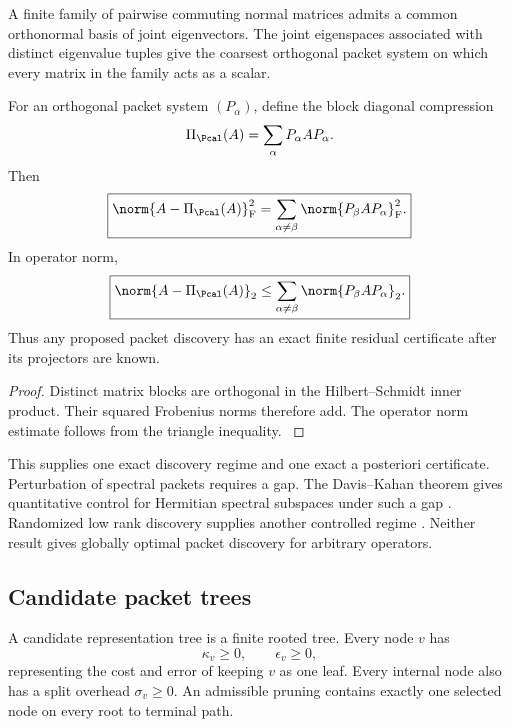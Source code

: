 \begin{standardfact}\label{main:standardfact:004}\label{fact:simultaneous}
A finite family of pairwise commuting normal matrices admits a common orthonormal basis of joint eigenvectors. The joint eigenspaces associated with distinct eigenvalue tuples give the coarsest orthogonal packet system on which every matrix in the family acts as a scalar.
\end{standardfact}

\begin{proposition}\label{main:proposition:008}\label{prop:block_discovery_certificate}
For an orthogonal packet system \((P_\alpha)\), define the block diagonal compression
\[
\Pi_{\Pcal}(A)
=
\sum_\alpha P_\alpha AP_\alpha.
\]
Then
\[
\boxed{
\norm{A-\Pi_{\Pcal}(A)}_{\rm F}^2
=
\sum_{\alpha\neq\beta}
\norm{P_\beta AP_\alpha}_{\rm F}^2.
}
\]
In operator norm,
\[
\boxed{
\norm{A-\Pi_{\Pcal}(A)}_2
\leq
\sum_{\alpha\neq\beta}
\norm{P_\beta AP_\alpha}_2.
}
\]
Thus any proposed packet discovery has an exact finite residual certificate after its projectors are known.
\end{proposition}

\begin{proof}\label{main:proof:042}
Distinct matrix blocks are orthogonal in the Hilbert--Schmidt inner product. Their squared Frobenius norms therefore add. The operator norm estimate follows from the triangle inequality.
\label{main:proof:042:end}\end{proof}

This supplies one exact discovery regime and one exact a posteriori certificate. Perturbation of spectral packets requires a gap. The Davis--Kahan theorem gives quantitative control for Hermitian spectral subspaces under such a gap \cite{DavisKahan1970}. Randomized low rank discovery supplies another controlled regime \cite{HalkoMartinssonTropp2011,MartinssonTropp2020}. Neither result gives globally optimal packet discovery for arbitrary operators.

\subsection{Candidate packet trees}\label{main:subsection:013}

\begin{definition}\label{main:definition:012}\label{def:candidate_tree}
A candidate representation tree is a finite rooted tree. Every node \(v\) has
\[
\kappa_v\geq0,
\qquad
\epsilon_v\geq0,
\]
representing the cost and error of keeping \(v\) as one leaf. Every internal node also has a split overhead \(\sigma_v\geq0\). An admissible pruning contains exactly one selected node on every root to terminal path.
\end{definition}

